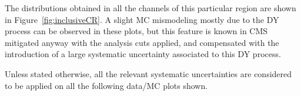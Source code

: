 \documentclass[a4paper, 10pt, openright]{report}
\begin{document}
The distributions obtained in all the channels of this particular region are shown in Figure~\ref{fig:inclusiveCR}. A slight \ac{MC} mismodeling mostly due to the \ac{DY} process can be observed in these plots, but this feature is known in \ac{CMS} mitigated anyway with the analysis cuts applied, and compensated with the introduction of a large systematic uncertainty associated to this \ac{DY} process.

Unless stated otherwise, all the relevant systematic uncertainties are considered to be applied on all the following data/\ac{MC} plots shown.

\begin{figure}[htbp]
\centering
{}
\end{figure}
\end{document}
